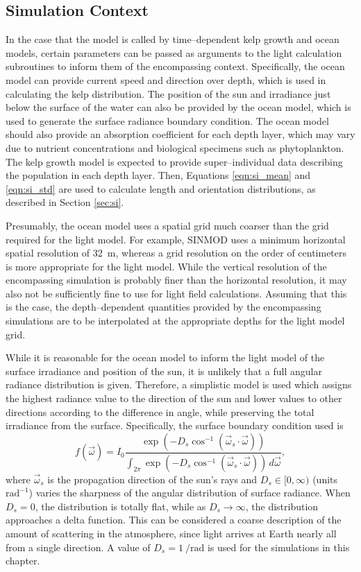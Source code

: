 \subsection{Simulation Context}
\label{sec:simulation_context}
In the case that the model is called by time--dependent kelp growth and ocean models, certain parameters can be passed as arguments to the light calculation subroutines to inform them of the encompassing context.
Specifically, the ocean model can provide current speed and direction over depth, which is used in calculating the kelp distribution.
The position of the sun and irradiance just below the surface of the water can also be provided by the ocean model, which is used to generate the surface radiance boundary condition.
The ocean model should also provide an absorption coefficient for each depth layer, which may vary due to nutrient concentrations and biological specimens such as phytoplankton.
The kelp growth model is expected to provide super--individual data describing the population in each depth layer.
Then, Equations \eqref{eqn:si_mean} and \eqref{eqn:si_std} are used to calculate length and orientation distributions, as described in Section \ref{sec:si}.

Presumably, the ocean model uses a spatial grid much coarser than the grid required for the light model.
For example, SINMOD \cite{wassmann_modelling_2006} uses a minimum horizontal spatial resolution of \SI{32}{\m}, whereas a grid resolution on the order of centimeters is more appropriate for the light model.
While the vertical resolution of the encompassing simulation is probably finer than the horizontal resolution, it may also not be sufficiently fine to use for light field calculations.
Assuming that this is the case, the depth--dependent quantities provided by the encompassing simulations are to be interpolated at the appropriate depths for the light model grid.

While it is reasonable for the ocean model to inform the light model of the surface irradiance and position of the sun, it is unlikely that a full angular radiance distribution is given.
Therefore, a simplistic model is used which assigns the highest radiance value to the direction of the sun and lower values to other directions according to the difference in angle, while preserving the total irradiance from the surface.
Specifically, the surface boundary condition used is
\begin{equation}
  f(\vec{\omega}) = I_0\frac{\exp\left( -D_s \cos^{-1}\left(\vec{\omega}_s \cdot \vec{\omega}\right) \right)}{\int_{2\pi}\exp\left( -D_s \cos^{-1}\left(\vec{\omega}_s \cdot \vec{\omega}\right) \right)\, d\vec{\omega}},
\end{equation}
where $\vec{\omega}_s$ is the propagation direction of the sun's rays and $D_s\in[0, \infty)$ (units $\mbox{rad}^{-1}$) varies the sharpness of the angular distribution of surface radiance.
When $D_s=0$, the distribution is totally flat, while as $D_s \to \infty$, the distribution approaches a delta function.
This can be considered a coarse description of the amount of scattering in the atmosphere, since light arrives at Earth nearly all from a single direction.
A value of $D_s=\SI{1}{\per\radian}$ is used for the simulations in this chapter.


